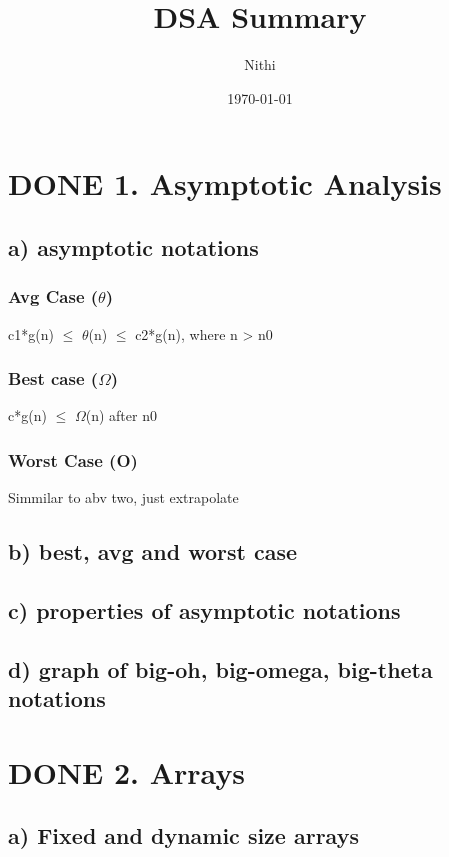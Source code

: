 \documentclass[11pt]{article}
\author{Nithi}
\date{\today}
\title{DSA Summary}
\begin{document}
\maketitle
\tableofcontents

\section{{\bfseries\sffamily DONE} 1. Asymptotic Analysis}
\label{sec:org5f424f6}
\subsection{a) asymptotic notations}
\label{sec:orgb07da24}
\subsubsection{Avg Case (\(\theta\))}
\label{sec:org815a9d2}
c1*g(n) \(\le\) \(\theta\)(n) \(\le\) c2*g(n), where n > n0
\subsubsection{Best case (\(\Omega\))}
\label{sec:orgff34de2}
c*g(n) \(\le\) \(\Omega\)(n) after n0
\subsubsection{Worst Case (O)}
\label{sec:org0ab05db}
Simmilar to abv two, just extrapolate
\subsection{b) best, avg and worst case}
\label{sec:org415546f}
\subsection{c) properties of asymptotic notations}
\label{sec:org037c582}
\subsection{d) graph of big-oh, big-omega, big-theta notations}
\label{sec:org28083ed}
\section{{\bfseries\sffamily DONE} 2. Arrays}
\label{sec:org5e0c366}
\subsection{a) Fixed and dynamic size arrays}
\label{sec:org60874b2}
\end{document}
